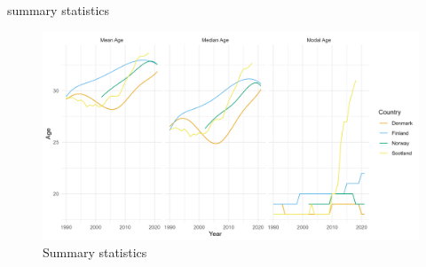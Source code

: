 \documentclass[
  ignorenonframetext,
]{beamer}
\begin{document}
\begin{frame}{summary statistics}
\protect\hypertarget{summary-statistics}{}
\begin{figure}

{\centering \includegraphics{figures/summary_statistics.png}

}

\caption{Summary statistics}

\end{figure}
\end{frame}
\end{document}
